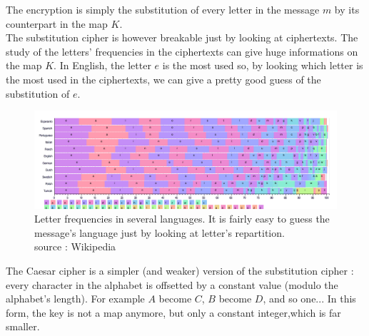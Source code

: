 \begin{table}[h!]
    \centering
	\caption{Exemple of a encryption using the substitution procedure}
	\label{tab:ExempleSubstitutionEncryption}
\end{table}


The encryption is simply the substitution of every letter in the message $m$ by its counterpart in the map $K$.\\
The substitution cipher is however breakable just by looking at ciphertexts. The study of the letters' frequencies in the ciphertexts can give huge informations on the map $K$. In English, the letter $e$ is the most used so, by looking which letter is the most used in the ciphertexts, we can give a pretty good guess of the substitution of $e$.\\

\begin{figure}[ht!]
    \centering
		\includegraphics[width=\textwidth]{images/letter_frequency}
	\caption{Letter frequencies in several languages. It is fairly easy to guess the message's language just by looking at letter's repartition. \\ source : Wikipedia}
	\label{fig:LetterFrequency}
\end{figure}

The Caesar cipher is a simpler (and weaker) version of the substitution cipher : every character in the alphabet is offsetted by a constant value (modulo the alphabet's length). For example $A$ become $C$, $B$ become $D$, and so one... In this form, the key is not a map anymore, but only a constant integer,which is far smaller. 

%    



